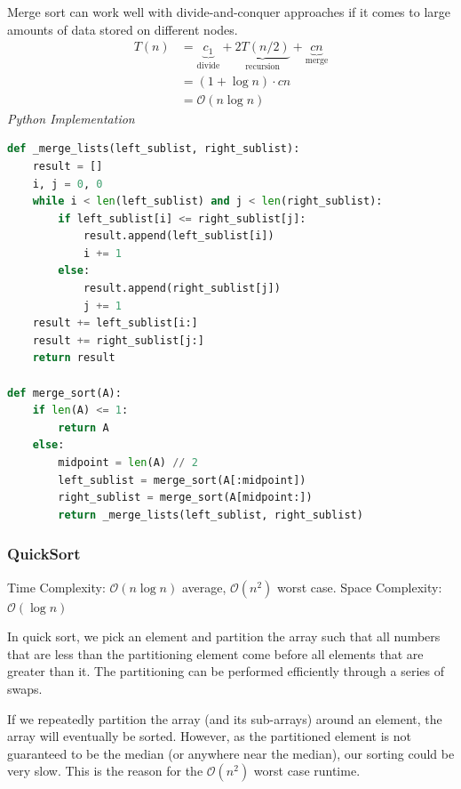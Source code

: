 \documentclass{article}
\newcommand{\bigO}{\mathcal{O}}
\begin{document}
    Merge sort can work well with divide-and-conquer approaches if it comes to large amounts of data stored on different nodes. 
    \begin{align*}
        T(n) &= 
            \underbrace{c_1}_\text{divide}
            + \underbrace{2T(n/2)}_\text{recursion}
            + \underbrace{c  n}_\text{merge}\\
        &= (1 + \log n) \cdot cn\\
        &= \bigO(n \log n)
    \end{align*}
\vspace{8pt} \emph{Python Implementation}
\begin{lstlisting}[language=Python]
def _merge_lists(left_sublist, right_sublist):
    result = []
    i, j = 0, 0
    while i < len(left_sublist) and j < len(right_sublist):
        if left_sublist[i] <= right_sublist[j]:
            result.append(left_sublist[i])
            i += 1
        else:
            result.append(right_sublist[j])
            j += 1
    result += left_sublist[i:]
    result += right_sublist[j:]
    return result

def merge_sort(A):
    if len(A) <= 1:
        return A
    else:
        midpoint = len(A) // 2
        left_sublist = merge_sort(A[:midpoint])
        right_sublist = merge_sort(A[midpoint:])
        return _merge_lists(left_sublist, right_sublist)
\end{lstlisting}
    
    \subsubsection{QuickSort}
     Time Complexity: $\bigO (n \log n)$ average, $\bigO (n^2)$ worst case. Space Complexity: $\bigO (\log n )$
     
     In quick sort, we pick an element and partition the array such that all numbers that are less than the partitioning element come before all elements that are greater than it. The partitioning can be performed efficiently through a series of swaps.

    If we repeatedly partition the array (and its sub-arrays) around an element, the array will eventually be sorted. However, as the partitioned element is not guaranteed to be the median (or anywhere near the median), our sorting could be very slow. This is the reason for the $\bigO(n^2)$ worst case runtime.
    
\end{document}
